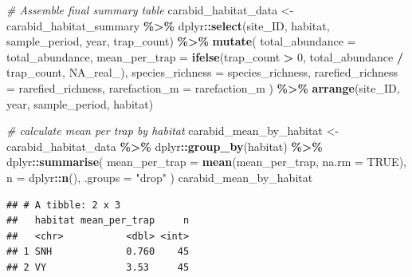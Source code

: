 \documentclass[
]{article}
\newenvironment{Shaded}{\begin{snugshade}}{\end{snugshade}}
\newcommand{\AttributeTok}[1]{\textcolor[rgb]{0.13,0.29,0.53}{#1}}
\newcommand{\CommentTok}[1]{\textcolor[rgb]{0.56,0.35,0.01}{\textit{#1}}}
\newcommand{\ConstantTok}[1]{\textcolor[rgb]{0.56,0.35,0.01}{#1}}
\newcommand{\DecValTok}[1]{\textcolor[rgb]{0.00,0.00,0.81}{#1}}
\newcommand{\FunctionTok}[1]{\textcolor[rgb]{0.13,0.29,0.53}{\textbf{#1}}}
\newcommand{\NormalTok}[1]{#1}
\newcommand{\OtherTok}[1]{\textcolor[rgb]{0.56,0.35,0.01}{#1}}
\newcommand{\SpecialCharTok}[1]{\textcolor[rgb]{0.81,0.36,0.00}{\textbf{#1}}}
\newcommand{\StringTok}[1]{\textcolor[rgb]{0.31,0.60,0.02}{#1}}
\begin{document}
\begin{Shaded}
\begin{Highlighting}[]
\CommentTok{\# Assemble final summary table}
\NormalTok{carabid\_habitat\_data }\OtherTok{\textless{}{-}}\NormalTok{ carabid\_habitat\_summary }\SpecialCharTok{\%\textgreater{}\%}
\NormalTok{  dplyr}\SpecialCharTok{::}\FunctionTok{select}\NormalTok{(site\_ID, habitat, sample\_period, year, trap\_count) }\SpecialCharTok{\%\textgreater{}\%}
  \FunctionTok{mutate}\NormalTok{(}
    \AttributeTok{total\_abundance   =}\NormalTok{ total\_abundance,}
    \AttributeTok{mean\_per\_trap     =} \FunctionTok{ifelse}\NormalTok{(trap\_count }\SpecialCharTok{\textgreater{}} \DecValTok{0}\NormalTok{, total\_abundance }\SpecialCharTok{/}\NormalTok{ trap\_count, }\ConstantTok{NA\_real\_}\NormalTok{),}
    \AttributeTok{species\_richness  =}\NormalTok{ species\_richness,}
    \AttributeTok{rarefied\_richness =}\NormalTok{ rarefied\_richness,}
    \AttributeTok{rarefaction\_m     =}\NormalTok{ rarefaction\_m}
\NormalTok{  ) }\SpecialCharTok{\%\textgreater{}\%}
  \FunctionTok{arrange}\NormalTok{(site\_ID, year, sample\_period, habitat)}

\CommentTok{\# calculate mean per trap by habitat}
\NormalTok{carabid\_mean\_by\_habitat }\OtherTok{\textless{}{-}}\NormalTok{ carabid\_habitat\_data }\SpecialCharTok{\%\textgreater{}\%}
\NormalTok{  dplyr}\SpecialCharTok{::}\FunctionTok{group\_by}\NormalTok{(habitat) }\SpecialCharTok{\%\textgreater{}\%}
\NormalTok{  dplyr}\SpecialCharTok{::}\FunctionTok{summarise}\NormalTok{(}
    \AttributeTok{mean\_per\_trap =} \FunctionTok{mean}\NormalTok{(mean\_per\_trap, }\AttributeTok{na.rm =} \ConstantTok{TRUE}\NormalTok{),}
    \AttributeTok{n             =}\NormalTok{ dplyr}\SpecialCharTok{::}\FunctionTok{n}\NormalTok{(),}
    \AttributeTok{.groups =} \StringTok{"drop"}
\NormalTok{  )}
\NormalTok{carabid\_mean\_by\_habitat}
\end{Highlighting}
\end{Shaded}

\begin{verbatim}
## # A tibble: 2 x 3
##   habitat mean_per_trap     n
##   <chr>           <dbl> <int>
## 1 SNH             0.760    45
## 2 VY              3.53     45
\end{verbatim}
\end{document}
